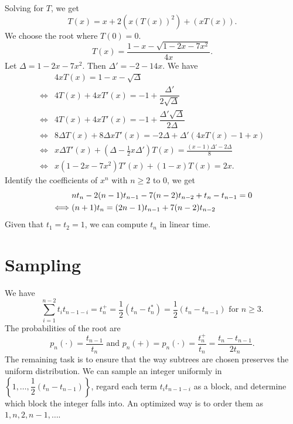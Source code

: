 Solving for $T$, we get
$$T(x) = x + 2(x(T(x))^2) + (xT(x)).$$
We choose the root where $T(0)=0$.
\begin{equation}
  T(x) = \frac{1 - x - \sqrt{1 - 2x - 7x^2}}{4x}.
\end{equation}
Let $\Delta=1 - 2x - 7x^2$. Then $\Delta' = -2 - 14x$. We have
\begin{align*}
       & 4xT(x) = 1 - x - \sqrt{\Delta}                                                                      \\
  \iff & 4T(x) + 4xT'(x) = -1 + \dfrac{\Delta'}{2\sqrt{\Delta}}                                              \\
  \iff & 4T(x) + 4xT'(x) = -1 + \dfrac{\Delta'\sqrt{\Delta}}{2\Delta}                                        \\
  \iff & 8\Delta T(x) + 8\Delta xT'(x) = -2\Delta + \Delta'(4xT(x) - 1 + x)                                  \\
  \iff & x\Delta T'(x) + \left(\Delta - \frac{1}{2}x\Delta'\right) T(x) = \frac{(x - 1)\Delta' - 2\Delta}{8} \\
  \iff & x(1 - 2x - 7x^2) T'(x) + (1 - x) T(x) = 2x.
\end{align*}
Identify the coefficients of $x^n$ with $n\ge 2$ to 0, we get
\begin{align}
       & n t_n - 2(n-1) t_{n-1} - 7(n-2) t_{n-2} + t_n - t_{n-1}=0 \notag   \\
  \iff & (n+1)t_n = (2n - 1)t_{n-1} + 7(n - 2)t_{n-2} \label{eq:recurrence}
\end{align}
Given that $t_1 = t_2 = 1$, we can compute $t_n$ in linear time.

\section{Sampling}
We have
$$\sum_{i=1}^{n-2} t_i t_{n-1-i}=t_{n}^+=\dfrac{1}{2}(t_{n}-t_{n}^*)=\dfrac{1}{2}(t_{n}-t_{n-1}) \text{ for } n\ge 3.$$
The probabilities of the root are
\begin{equation}
  p_n(\cdot)=\dfrac{t_{n-1}}{t_n} \text{ and } p_n(+)=p_n(\cdot)=\dfrac{t^+_{n}}{t_n}=\dfrac{t_n-t_{n-1}}{2t_n}.
\end{equation}
The remaining task is to ensure that the way subtrees are chosen preserves the uniform distribution. We can sample an integer uniformly in $\left\{1,\ldots,\dfrac{1}{2}(t_{n}-t_{n-1})\right\}$, regard each term $t_i t_{n-1-i}$ as a block, and determine which block the integer falls into. An optimized way is to order them as $1,n,2,n-1,\ldots$.